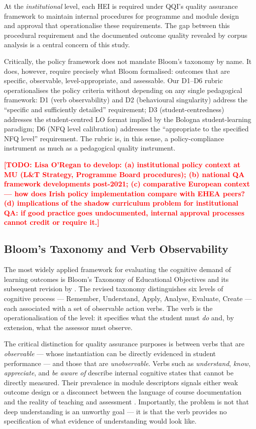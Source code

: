 \documentclass[12pt, a4paper]{article}
\newcommand{\todo}[1]{\textcolor{red}{\textbf{[TODO: #1]}}}
\begin{document}
At the \textit{institutional} level, each HEI is required under QQI's quality
assurance framework to maintain internal procedures for programme and module design
and approval that operationalise these requirements. The gap between this procedural
requirement and the documented outcome quality revealed by corpus analysis is a
central concern of this study.

Critically, the policy framework does not mandate Bloom's taxonomy by name. It does,
however, require precisely what Bloom formalised: outcomes that are specific,
observable, level-appropriate, and assessable. Our D1--D6 rubric operationalises
the policy criteria without depending on any single pedagogical framework: D1
(verb observability) and D2 (behavioural singularity) address the \enquote{specific
and sufficiently detailed} requirement; D3 (student-centredness) addresses the
student-centred LO format implied by the Bologna student-learning paradigm; D6
(NFQ level calibration) addresses the \enquote{appropriate to the specified NFQ
level} requirement. The rubric is, in this sense, a policy-compliance instrument
as much as a pedagogical quality instrument.

\todo{Lisa O'Regan to develop: (a) institutional policy context at MU (L\&T
Strategy, Programme Board procedures); (b) national QA framework developments
post-2021; (c) comparative European context — how does Irish policy implementation
compare with EHEA peers? (d) implications of the shadow curriculum problem for
institutional QA: if good practice goes undocumented, internal approval processes
cannot credit or require it.}

\subsection{Bloom's Taxonomy and Verb Observability}

The most widely applied framework for evaluating the cognitive demand of learning
outcomes is Bloom's Taxonomy of Educational Objectives \citep{bloom1956taxonomy} and
its subsequent revision by \citet{anderson2001taxonomy}. The revised taxonomy
distinguishes six levels of cognitive process --- Remember, Understand, Apply, Analyse,
Evaluate, Create --- each associated with a set of observable action verbs. The verb
is the operationalisation of the level: it specifies what the student must \emph{do}
and, by extension, what the assessor must observe.

The critical distinction for quality assurance purposes is between verbs that are
\emph{observable} --- whose instantiation can be directly evidenced in student
performance --- and those that are \emph{unobservable}. Verbs such as
\textit{understand}, \textit{know}, \textit{appreciate}, and \textit{be aware of}
describe internal cognitive states that cannot be directly measured. Their prevalence
in module descriptors signals either weak outcome design or a disconnect between
the language of course documentation and the reality of teaching and assessment
\citep{kennedy2007writing}. Importantly, the problem is not that deep understanding
is an unworthy goal --- it is that the verb provides no specification of what evidence
of understanding would look like.
\end{document}
